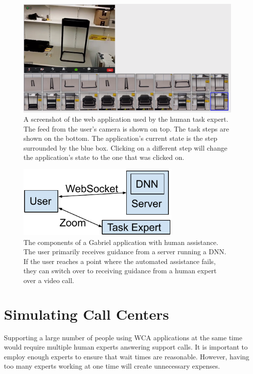 \begin{figure}[h]
  \includegraphics[width=14cm]{figures/expert_ui.png}
  \caption{A screenshot of the web application used by the human task expert.
    The feed from the user's camera is shown on top. The task steps are shown on
    the bottom. The application's current state is the step surrounded by the
    blue box. Clicking on a different step will change the application's state
    to the one that was clicked on.
  }\label{fig:expertui}
\end{figure}

\begin{figure}[h]
  \includegraphics[width=8cm]{figures/human_assitance.pdf}
  \caption{The components of a Gabriel application with human assistance. The
    user primarily receives guidance from a server running a DNN. If the user
    reaches a point where the automated assistance fails, they can switch over
    to receiving guidance from a human expert over a video call.
  }\label{fig:expert_components}
\end{figure}

\section{Simulating Call Centers}

Supporting a large number of people using WCA applications at the same time
would require multiple human experts answering support calls.
It is important to employ enough experts to ensure that wait times are
reasonable.
However, having too many experts working at one time will create unnecessary
expenses.

